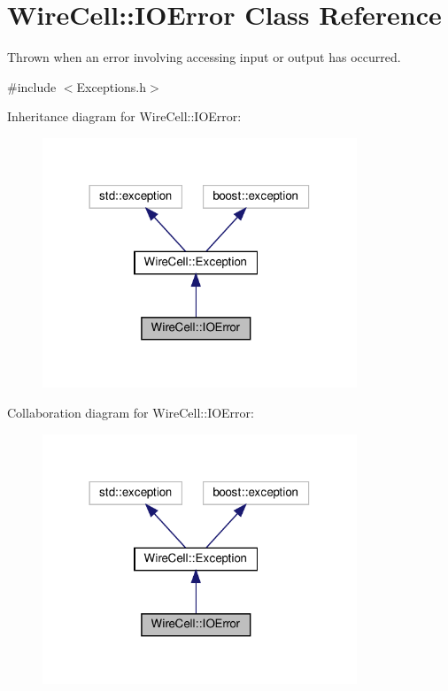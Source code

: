 \hypertarget{class_wire_cell_1_1_i_o_error}{}\section{Wire\+Cell\+:\+:I\+O\+Error Class Reference}
\label{class_wire_cell_1_1_i_o_error}


Thrown when an error involving accessing input or output has occurred.  




{\ttfamily \#include $<$Exceptions.\+h$>$}



Inheritance diagram for Wire\+Cell\+:\+:I\+O\+Error\+:
\nopagebreak
\begin{figure}[H]
\begin{center}
\leavevmode
\includegraphics[width=266pt]{class_wire_cell_1_1_i_o_error__inherit__graph}
\end{center}
\end{figure}


Collaboration diagram for Wire\+Cell\+:\+:I\+O\+Error\+:
\nopagebreak
\begin{figure}[H]
\begin{center}
\leavevmode
\includegraphics[width=266pt]{class_wire_cell_1_1_i_o_error__coll__graph}
\end{center}
\end{figure}
